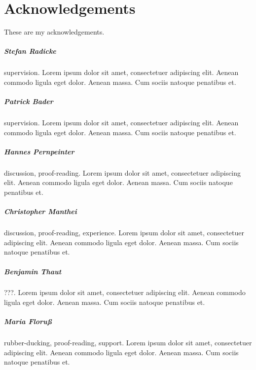 
\chapter*{Acknowledgements}
\label{cha:Acknowledgements}

These are my acknowledgements.


\paragraph{Stefan Radicke}
  supervision.
  Lorem ipsum dolor sit amet, consectetuer adipiscing elit. Aenean commodo ligula eget dolor. Aenean massa. Cum sociis natoque penatibus et.

\paragraph{Patrick Bader}
  supervision.
  Lorem ipsum dolor sit amet, consectetuer adipiscing elit. Aenean commodo ligula eget dolor. Aenean massa. Cum sociis natoque penatibus et.

\paragraph{Hannes Pernpeinter}
  discussion, proof-reading.
  Lorem ipsum dolor sit amet, consectetuer adipiscing elit. Aenean commodo ligula eget dolor. Aenean massa. Cum sociis natoque penatibus et.

\paragraph{Christopher Manthei}
  discussion, proof-reading, experience.
  Lorem ipsum dolor sit amet, consectetuer adipiscing elit. Aenean commodo ligula eget dolor. Aenean massa. Cum sociis natoque penatibus et.

\paragraph{Benjamin Thaut}
  ???.
  Lorem ipsum dolor sit amet, consectetuer adipiscing elit. Aenean commodo ligula eget dolor. Aenean massa. Cum sociis natoque penatibus et.

\paragraph{Maria Floruß}
  rubber-ducking, proof-reading, support.
  Lorem ipsum dolor sit amet, consectetuer adipiscing elit. Aenean commodo ligula eget dolor. Aenean massa. Cum sociis natoque penatibus et.
